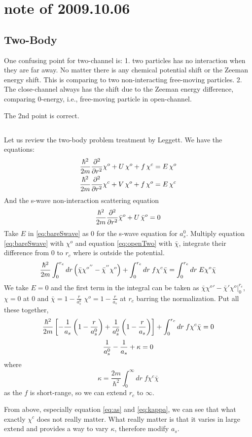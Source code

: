 \section{note of 2009.10.06}
\subsection{Two-Body}
One confusing point for two-channel is: 1. two particles has no interaction when they are far away.  No matter there is any chemical potential shift or the Zeeman energy shift.  This is comparing to two non-interacting free-moving particles. 2.  The close-channel always has the shift due to the Zeeman energy difference, comparing 0-energy, i.e., free-moving particle in open-channel.  

The 2nd point is correct.  

\subsection{}
Let us review the two-body problem treatment by Leggett\cite{Leggett}.  We have the equations:
\begin{subequations}\begin{align}
\frac{\hbar^2}{2m}\frac{\partial^2{}}{\partial{{r}^2}}\chi^o+U\,\chi^o+f\,\chi^c&=E\, \chi^o\label{eq:openTwo}\\
\frac{\hbar^2}{2m}\frac{\partial^2{}}{\partial{{r}^2}}\chi^c+V\,\chi^o+f\,\chi^o&=E\, \chi^c\label{eq:closeTwo}
\end{align}\end{subequations}
And the s-wave non-interaction scattering equation 
\begin{equation}\label{eq:bareSwave}
\frac{\hbar^2}{2m}\frac{\partial^2{}}{\partial{{r}^2}}\bar\chi^o+U\,\bar\chi^o=0
\end{equation}
Take $E$ in \eqref{eq:bareSwave} as 0 for the s-wave equation for $a^0_s$. Multiply equation \eqref{eq:bareSwave} with $\chi^o$ and equation \eqref{eq:openTwo} with $\bar\chi$, integrate their difference from 0 to $r_c$ where is outside the potential. 
\[\frac{\hbar^2}{2m}\int_0^{r_c}dr\left(\bar\chi{\chi^o}^{''}-\bar\chi^{''}\chi^o\right)+\int_0^{r_c}dr\;f\chi^c\bar\chi=\int_0^{r_c}dr\;E\chi^o\bar\chi\]
We take $E=0$ and the first term in the integral can be taken as $\left.\bar\chi{\chi^o}'-\bar\chi'\chi^o\right|_0^{r_c}$, $\chi=0$ at 0 and $\bar\chi=1-\frac{r}{a^0_s}$ $\chi^o=1-\frac{r}{a_s}$ at $r_c$ barring the normalization.  Put all these together,
\[\frac{\hbar^2}{2m}\left[-\frac{1}{a_s}\left(1-\frac{r}{a^0_s}\right)+\frac{1}{a^0_s}\left(1-\frac{r}{a_s}\right)\right]+\int_0^{r_c}dr\;f\chi^c\bar\chi=0\]
\begin{equation}\label{eq:as}
\frac{1}{a_s^0}-\frac{1}{a_s}+\kappa=0
\end{equation}  
where 
\begin{equation}\label{eq:kappa}
\kappa=\frac{2m}{\hbar^2}\int_0^{\infty}dr\;f\chi^c\bar\chi
\end{equation}
as the $f$ is short-range, so we can extend $r_c$ to $\infty$.

From above, especially equation \eqref{eq:as} and \eqref{eq:kappa}, we can see that what exactly $\chi^c$ does not really matter.  What really matter is that it varies in large extend and provides a way to vary $\kappa$, therefore modify $a_s$.   
